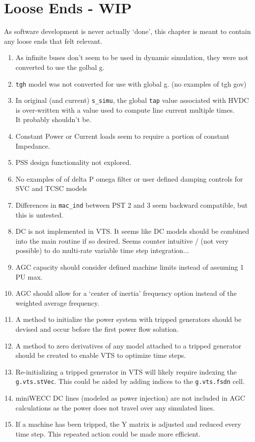 \chapter{Loose Ends - WIP}
As software development is never actually `done', this chapter is meant to contain any loose ends that felt relevant.

\begin{enumerate}
	\item As infinite buses don't seem to be used in dynamic simulation, they were not converted to use the golbal g.
	\item \verb|tgh| model was not converted for use with global g. (no examples of tgh gov)
	\item In original (and current) \verb|s_simu|, the global \verb|tap| value associated with HVDC is over-written with  a value used to compute line current multiple times. \\It probably shouldn't be.
	\item Constant Power or Current loads seem to require a portion of constant Impedance.
	\item PSS design functionality not explored.
	\item No examples of of delta P omega filter or user defined damping controls for SVC and TCSC models
	\item Differences in \verb|mac_ind| between PST 2 and 3 seem backward compatible, but this is untested.
	\item DC is not implemented in VTS. It seems like DC models should be combined into the main routine if so desired. Seems counter intuitive / (not very possible) to do multi-rate variable time step integration...
	\item AGC capacity should consider defined machine limits instead of assuming 1 PU max.
	\item AGC should allow for a `center of inertia' frequency option instead of the weighted average frequency.
	\item A method to initialize the power system with tripped generators should be devised and occur before the first power flow solution.
	\item A method to zero derivatives of any model attached to a tripped generator should be created to enable VTS to optimize time steps.
	\item Re-initializing a tripped generator in VTS will likely require indexing the \verb|g.vts.stVec|. This could be aided by adding indices to the \verb|g.vts.fsdn| cell.
	\item miniWECC DC lines (modeled as power injection) are not included in AGC calculations as the power does not travel over any simulated lines.
	\item If a machine has been tripped, the Y matrix is adjusted and reduced every time step. This repeated action could be made more efficient.
\end{enumerate}
